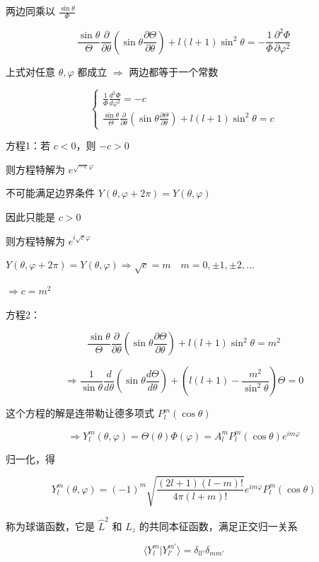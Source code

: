 \documentclass[lang=cn,10pt]{elegantbook}
\begin{document}
两边同乘以 $\frac{\sin\theta}{\Phi}$

\[
\frac{\sin\theta}{\Theta} \frac{\partial}{\partial \theta} \left( \sin\theta \frac{\partial \Theta}{\partial \theta} \right) + l(l+1) \sin^2\theta = -\frac{1}{\Phi} \frac{\partial^2 \Phi}{\partial \varphi^2}
\]

上式对任意 $\theta, \varphi$ 都成立 $\Rightarrow$ 两边都等于一个常数

\[
\left\{
\begin{array}{l}
	\frac{1}{\Phi} \frac{d^2 \Phi}{d\varphi^2} = -c \\
	\frac{\sin\theta}{\Theta} \frac{\partial}{\partial \theta} \left( \sin\theta \frac{\partial \Theta}{\partial \theta} \right) + l(l+1) \sin^2\theta = c
\end{array}
\right.
\]

方程1：若 $c < 0$，则 $-c > 0$

则方程特解为 $e^{\sqrt{-c}\varphi}$

不可能满足边界条件 $Y(\theta, \varphi + 2\pi) = Y(\theta, \varphi)$

因此只能是 $c > 0$

则方程特解为 $e^{i\sqrt{c}\varphi}$

$Y(\theta, \varphi + 2\pi) = Y(\theta, \varphi) \Rightarrow \sqrt{c} = m \quad m = 0, \pm1, \pm2, \ldots$

$\Rightarrow c = m^2$

方程2：

\[
\frac{\sin\theta}{\Theta} \frac{\partial}{\partial \theta} \left( \sin\theta \frac{\partial \Theta}{\partial \theta} \right) + l(l+1) \sin^2\theta = m^2
\]

\[
\Rightarrow \frac{1}{\sin\theta} \frac{d}{d\theta} \left( \sin\theta \frac{d\Theta}{d\theta} \right) + \left( l(l+1) - \frac{m^2}{\sin^2\theta} \right) \Theta = 0
\]

这个方程的解是连带勒让德多项式 $P_l^m(\cos\theta)$

\[
\Rightarrow Y_l^m(\theta, \varphi) = \Theta(\theta) \Phi(\varphi) = A_l^m P_l^m(\cos\theta) e^{im\varphi}
\]

归一化，得

\[
Y_l^m(\theta, \varphi) = (-1)^m\sqrt{\frac{(2l+1)(l-m)!}{4\pi(l+m)!}} e^{im\varphi} P_l^m(\cos\theta)
\]



称为球谐函数，它是 $\hat{L}^2$ 和 $\hat{L}_z$ 的共同本征函数，满足正交归一关系

\begin{equation}
	\langle Y_{l}^{m} | Y_{l'}^{m'} \rangle = \delta_{ll'} \delta_{mm'}
\end{equation}
\end{document}
